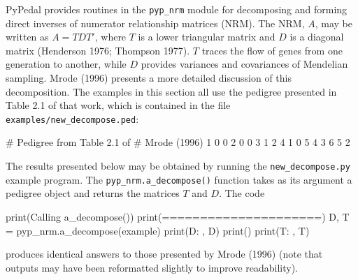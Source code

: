 \documentclass[
  letterpaper,
  DIV=11,
  numbers=noendperiod]{scrreprt}
\newenvironment{Shaded}{\begin{snugshade}}{\end{snugshade}}
\newcommand{\BuiltInTok}[1]{\textcolor[rgb]{0.00,0.23,0.31}{#1}}
\newcommand{\CommentTok}[1]{\textcolor[rgb]{0.37,0.37,0.37}{#1}}
\newcommand{\DecValTok}[1]{\textcolor[rgb]{0.68,0.00,0.00}{#1}}
\newcommand{\NormalTok}[1]{\textcolor[rgb]{0.00,0.23,0.31}{#1}}
\newcommand{\OperatorTok}[1]{\textcolor[rgb]{0.37,0.37,0.37}{#1}}
\newcommand{\StringTok}[1]{\textcolor[rgb]{0.13,0.47,0.30}{#1}}
\begin{document}
PyPedal provides routines in the \texttt{pyp\_nrm} module for
decomposing and forming direct inverses of numerator relationship
matrices (NRM). The NRM, \(A\), may be written as \(A=TDT'\), where
\(T\) is a lower triangular matrix and \(D\) is a diagonal matrix
(Henderson 1976; Thompson 1977). \(T\) traces the flow of genes from one
generation to another, while \(D\) provides variances and covariances of
Mendelian sampling. Mrode (1996) presents a more detailed discussion of
this decomposition. The examples in this section all use the pedigree
presented in Table 2.1 of that work, which is contained in the file
\texttt{examples/new\_decompose.ped}:

\begin{Shaded}
\begin{Highlighting}[]
\CommentTok{\# Pedigree from Table 2.1 of}
\CommentTok{\# Mrode (1996)}
\DecValTok{1} \DecValTok{0} \DecValTok{0}
\DecValTok{2} \DecValTok{0} \DecValTok{0}
\DecValTok{3} \DecValTok{1} \DecValTok{2}
\DecValTok{4} \DecValTok{1} \DecValTok{0}
\DecValTok{5} \DecValTok{4} \DecValTok{3}
\DecValTok{6} \DecValTok{5} \DecValTok{2}
\end{Highlighting}
\end{Shaded}

The results presented below may be obtained by running the
\texttt{new\_decompose.py} example program. The
\texttt{pyp\_nrm.a\_decompose()} function takes as its argument a
pedigree object and returns the matrices \(T\) and \(D\). The code

\begin{Shaded}
\begin{Highlighting}[]
\BuiltInTok{print}\NormalTok{(}\StringTok{\textquotesingle{}Calling a\_decompose()\textquotesingle{}}\NormalTok{)}
\BuiltInTok{print}\NormalTok{(}\StringTok{\textquotesingle{}=====================\textquotesingle{}}\NormalTok{)}
\NormalTok{D, T  }\OperatorTok{=}\NormalTok{ pyp\_nrm.a\_decompose(example)}
\BuiltInTok{print}\NormalTok{(}\StringTok{\textquotesingle{}D: \textquotesingle{}}\NormalTok{, D)}
\BuiltInTok{print}\NormalTok{()}
\BuiltInTok{print}\NormalTok{(}\StringTok{\textquotesingle{}T: \textquotesingle{}}\NormalTok{, T)}
\end{Highlighting}
\end{Shaded}

produces identical answers to those presented by Mrode (1996) (note that
outputs may have been reformatted slightly to improve readability).
\end{document}
